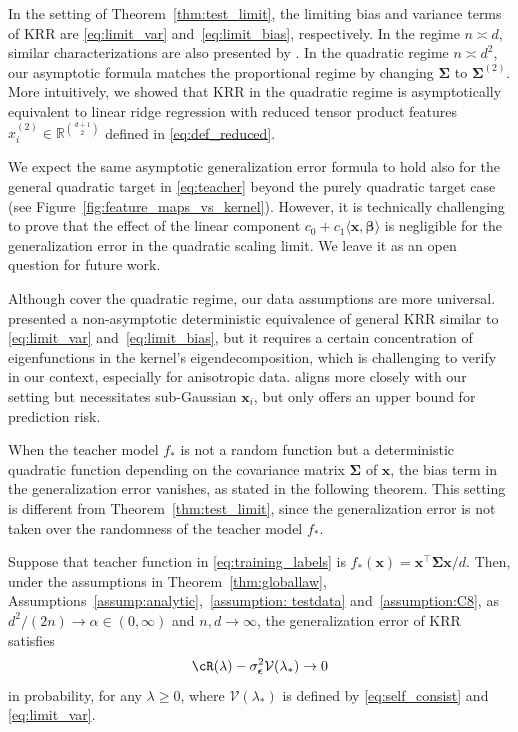 \documentclass[twoside,11pt]{article}
\newcommand{\bepsilon}{\boldsymbol{\epsilon}}
\def\bx{{\boldsymbol x}}
\def\bbeta{{\boldsymbol \beta}}
\def\bSigma{{\boldsymbol \Sigma}}
\def\cV{{\mathcal V}}
\def\cV{{\mathcal V}}
\newcommand{\1}{\mathbf{1}}
\begin{document}
In the setting of Theorem~\ref{thm:test_limit}, the limiting bias and variance terms of KRR are \eqref{eq:limit_var} and~\eqref{eq:limit_bias}, respectively. In the regime $n\asymp d$, similar characterizations are also presented by \cite{hastie2022surprises,bartlett2021deep}.  In the quadratic regime $n\asymp d^2$, our asymptotic formula matches the proportional regime by changing $\bSigma$ to $\bSigma^{(2)}$. More intuitively, we showed that KRR in the quadratic regime is asymptotically equivalent to linear ridge regression with reduced tensor product features $x_i^{(2)}\in \mathbb R^{\binom{d+1}{2}}$ defined in \eqref{eq:def_reduced}. 

We expect the same asymptotic generalization error formula to hold also for the general quadratic target in \eqref{eq:teacher} beyond the purely quadratic target case (see Figure~\ref{fig:feature_maps_vs_kernel}). However, it is technically challenging to prove that the effect of the linear component $c_0+c_1\langle \bx,\bbeta\rangle$ is negligible for the generalization error in the quadratic scaling limit. We leave it as an open question for future work.

\begin{remark}
Although \cite{mei2021generalization,misiakiewicz2024non,gavrilopoulos2024geometrical} cover the quadratic regime, our data assumptions are more universal. \cite{misiakiewicz2024non} presented a non-asymptotic deterministic equivalence of general KRR similar to \eqref{eq:limit_var} and~\eqref{eq:limit_bias}, but it requires a certain concentration of eigenfunctions in the kernel's eigendecomposition, which is challenging to verify in our context, especially for anisotropic data. \cite{gavrilopoulos2024geometrical} aligns more closely with our setting but necessitates sub-Gaussian $\bx_i$, but only offers an upper bound for prediction risk.
\end{remark}



When the teacher model $f_*$ is not a random function but a deterministic quadratic function depending on the covariance matrix $\bSigma$ of $\bx$, the bias term in the generalization error vanishes, as stated in the following theorem.  This setting is different from Theorem~\ref{thm:test_limit}, since the generalization error is not taken over the randomness of the teacher model $f_*$.

\begin{theorem}\label{thm:test_limit_deterministic}
Suppose that teacher function in \eqref{eq:training_labels} is $f_*(\bx)=\bx^\top\bSigma\bx/d$. Then, under  the assumptions in Theorem~\ref{thm:globallaw}, Assumptions~\ref{assump:analytic},~\ref{assumption: testdata} and~\ref{assumption:C8}, as $d^2/(2n)\to \alpha\in (0,\infty)$ and $n,d\to \infty$, the generalization error of KRR satisfies 
 $$\cR(\lambda)-\sigma_{\bepsilon}^2\cV(\lambda_*)\to 0$$
in probability, for any $\lambda\ge 0$, where $\cV(\lambda_*)$ is defined by \eqref{eq:self_consist} and \eqref{eq:limit_var}.
\end{theorem}
\end{document}
